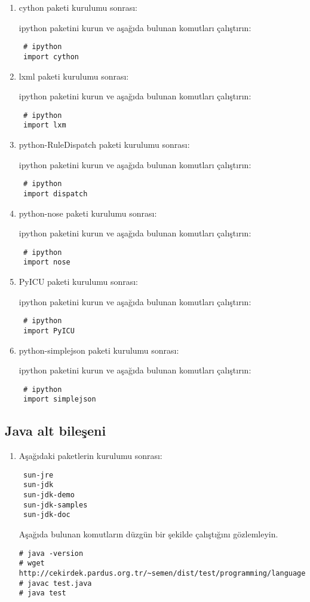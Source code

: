 \documentclass[a4paper,10pt]{article}
\begin{document}
\begin{enumerate}
\item cython paketi kurulumu sonrası:

ipython paketini kurun ve aşağıda bulunan komutları çalıştırın:
\begin{verbatim}
 # ipython
 import cython
\end{verbatim}

\item lxml paketi kurulumu sonrası:  

ipython paketini kurun ve aşağıda bulunan komutları çalıştırın:
\begin{verbatim}
 # ipython
 import lxm
\end{verbatim}
\item python-RuleDispatch paketi kurulumu sonrası:  

ipython paketini kurun ve aşağıda bulunan komutları çalıştırın:
\begin{verbatim}
 # ipython
 import dispatch
\end{verbatim}

\item python-nose paketi kurulumu sonrası:  

ipython paketini kurun ve aşağıda bulunan komutları çalıştırın:
\begin{verbatim}
 # ipython
 import nose
\end{verbatim}

\item PyICU paketi kurulumu sonrası:  

ipython paketini kurun ve aşağıda bulunan komutları çalıştırın:
\begin{verbatim}
 # ipython
 import PyICU
\end{verbatim}

\item python-simplejson paketi kurulumu sonrası:  

ipython paketini kurun ve aşağıda bulunan komutları çalıştırın:
\begin{verbatim}
 # ipython
 import simplejson
\end{verbatim}

\end{enumerate}

\subsection{Java alt bileşeni}
\begin{enumerate}
 \item Aşağıdaki paketlerin kurulumu sonrası:
\begin{verbatim}
 sun-jre
 sun-jdk
 sun-jdk-demo
 sun-jdk-samples
 sun-jdk-doc
\end{verbatim}

Aşağıda bulunan komutların düzgün bir şekilde çalıştığını gözlemleyin.
\begin{verbatim}
# java -version
# wget http://cekirdek.pardus.org.tr/~semen/dist/test/programming/language/java/test.java
# javac test.java
# java test
\end{verbatim}
\end{enumerate}
\end{document}
